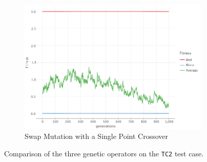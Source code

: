 \begin{figure}[ht!]
\begin{subfigure}{0.35\textwidth}
            \includegraphics[width=\textwidth]{img/beacon_sp_swap_2.png}
            \caption{Swap Mutation with a Single Point Crossover}
            \label{fig:beacon:2:swap}
        \end{subfigure}
        \caption{Comparison of the three genetic operators on the \texttt{TC2} test case.}
        \label{fig:beacon:2}
    \end{figure}


